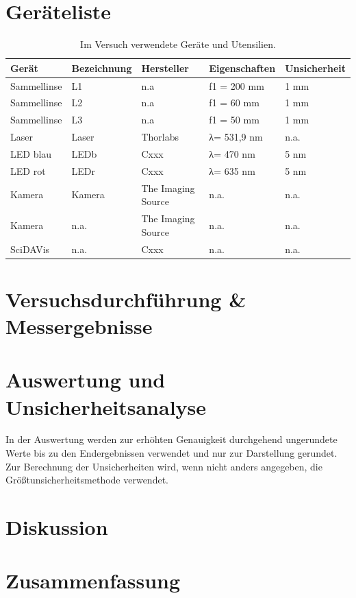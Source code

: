 \documentclass[12pt,a4paper,twoside]{article}
\begin{document}
\section{Geräteliste} %

    \begin{table}[H]
        \centering
        \caption{Im Versuch verwendete Geräte und Utensilien.}
        \label{tab:geraete}
        \begin{tabular}{| l | l | l | l | l |}
            \hline
            Gerät   & Bezeichnung  & Hersteller  & Eigenschaften  & Unsicherheit \\
            \hline
            Sammellinse & L1 & {n.a} & f1 = 200 mm & 1 mm \\
            Sammellinse & L2 & {n.a} & f1 = 60 mm  & 1 mm \\
            Sammellinse & L3 & {n.a} & f1 = 50 mm  & 1 mm \\
            Laser & Laser & Thorlabs & λ= 531,9 nm & {n.a.} \\
            LED blau & LEDb & Cxxx & λ= 470 nm & 5 nm \\
            LED rot & LEDr & Cxxx & λ= 635 nm & 5 nm \\
            Kamera & Kamera & The Imaging Source & {n.a.} & {n.a.}\\
            Kamera & {n.a.} & The Imaging Source & {n.a.} & {n.a.}\\
            SciDAVis & {n.a.} & Cxxx & {n.a.} & {n.a.} \\
            \hline
        \end{tabular}
    \end{table}


\section{Versuchsdurchführung \& Messergebnisse} %


\section{Auswertung und Unsicherheitsanalyse} %

In der Auswertung werden zur erhöhten Genauigkeit durchgehend ungerundete Werte bis zu den Endergebnissen verwendet und nur zur Darstellung gerundet. \\
Zur Berechnung der Unsicherheiten wird, wenn nicht anders angegeben, die Größtunsicherheitsmethode verwendet.


\section{Diskussion} %


\section{Zusammenfassung} %


\printbibliography[heading=bibintoc]
\end{document}
